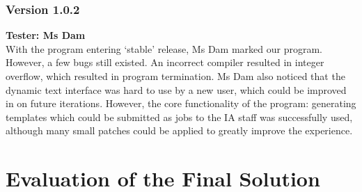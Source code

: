 \documentclass[oneside,openany,11pt,a4paper]{report}
\begin{document}
\subsubsection{Version 1.0.2}
\textbf{Tester: Ms Dam} \\
With the program entering ‘stable’ release, Ms Dam marked our program. However, a few bugs still existed.
An incorrect compiler resulted in integer overflow, which resulted in program termination. Ms Dam also noticed that the dynamic text interface
was hard to use by a new user, which could be improved in on future iterations. However, the core functionality of the program: generating
templates which could be submitted as jobs to the IA staff was successfully used, although many small patches could be applied to greatly
improve the experience.


\section{Evaluation of the Final Solution}
\end{document}
